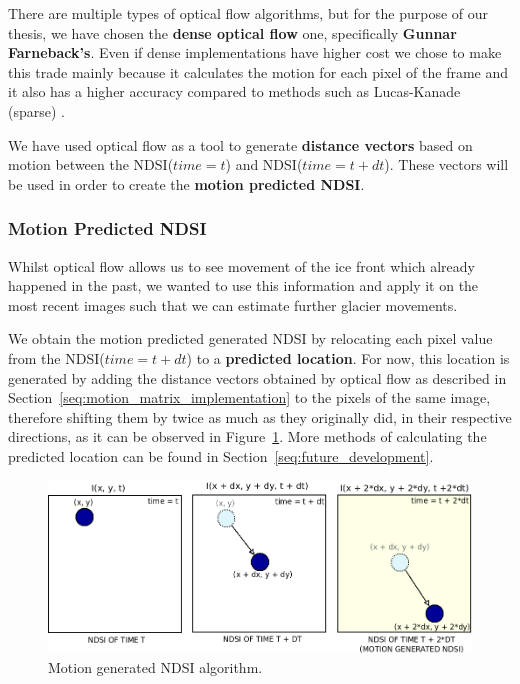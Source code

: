 \documentclass[11pt, a4paper]{report}
\begin{document}
	There are multiple types of optical flow algorithms, but for the purpose of our thesis, we have chosen the \textbf{dense optical flow} one, specifically \textbf{Gunnar Farneback's}. Even if dense implementations have higher cost we chose to make this trade mainly because it calculates the motion for each pixel of the frame and it also has a higher accuracy \cite{orb} compared to methods such as Lucas-Kanade (sparse) \cite{lukas}.
	
	We have used optical flow as a tool to generate \textbf{distance vectors} based on motion between the NDSI(\(time=t\)) and NDSI(\(time=t + dt\)). These vectors will be used in order to create the \textbf{motion predicted NDSI}.

	\subsubsection{Motion Predicted NDSI}
	
	Whilst optical flow allows us to see movement of the ice front which already happened in the past, we wanted to use this information and apply it on the most recent images such that we can estimate further glacier movements.

	We obtain the motion predicted generated NDSI by relocating each pixel value from the NDSI(\(time=t + dt\)) to a \textbf{predicted location}. For now, this location is generated by adding the distance vectors obtained by optical flow as described in Section~\ref{seq:motion_matrix_implementation} to the pixels of the same image, therefore shifting them by twice as much as they originally did, in their respective directions, as it can be observed in Figure~\ref{fig:motion_generated_schema}. More methods of calculating the predicted location can be found in Section~\ref{seq:future_development}.
	
	\begin{figure}[h]
		\centering
		\includegraphics[scale=0.5]{../images/motion_generated_schema.png}
		\caption{Motion generated NDSI algorithm.}
		\label{fig:motion_generated_schema}
	\end{figure}
\end{document}
